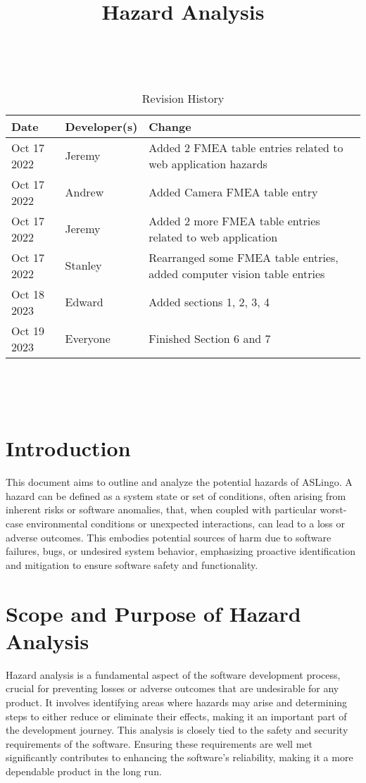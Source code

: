 \documentclass{article}
\title{Hazard Analysis\\\progname}
\author{\authname}
\date{}
\begin{document}
\maketitle
\thispagestyle{empty}

~\newpage


\begin{table}[hp]
\caption{Revision History} \label{TblRevisionHistory}
\begin{tabularx}{\textwidth}{llX}
\toprule
\textbf{Date} & \textbf{Developer(s)} & \textbf{Change}\\
\midrule
Oct 17 2022 & Jeremy & Added 2 FMEA table entries related to web application hazards\\
Oct 17 2022 & Andrew & Added Camera FMEA table entry\\
Oct 17 2022 & Jeremy & Added 2 more FMEA table entries related to web application\\
Oct 17 2022 & Stanley & Rearranged some FMEA table entries, added computer vision table entries\\
Oct 18 2023 & Edward & Added sections 1, 2, 3, 4\\
Oct 19 2023 & Everyone & Finished Section 6 and 7 \\
\bottomrule
\end{tabularx}
\end{table}

~\newpage

\tableofcontents

~\newpage


\section{Introduction}
This document aims to outline and analyze the potential hazards of ASLingo. A hazard can be defined as a system state or set of conditions, often arising from inherent risks or software anomalies, that, when coupled with particular worst-case environmental conditions or unexpected interactions, can lead to a loss or adverse outcomes. This embodies potential sources of harm due to software failures, bugs, or undesired system behavior, emphasizing proactive identification and mitigation to ensure software safety and functionality.

\section{Scope and Purpose of Hazard Analysis}
Hazard analysis is a fundamental aspect of the software development process, crucial for preventing losses or adverse outcomes that are undesirable for any product. It involves identifying areas where hazards may arise and determining steps to either reduce or eliminate their effects, making it an important part of the development journey. This analysis is closely tied to the safety and security requirements of the software. Ensuring these requirements are well met significantly contributes to enhancing the software's reliability, making it a more dependable product in the long run.
\end{document}
